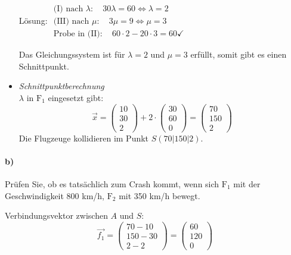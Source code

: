 \documentclass{ajc}
\numberwithin{equation}{subsection}
\begin{document}
\begin{itemize}
		Lösung: $\begin{array}{l}
			\text{(I) nach } \lambda: \quad 30 \lambda = 60 \Leftrightarrow \lambda = 2 \\ \text{(III) nach } \mu: \quad 3\mu = 9 \Leftrightarrow \mu = 3 \\ \text{Probe in  (II)}: \quad 60\cdot2 -20\cdot3 = 60 \checkmark \end{array}$
		
		Das Gleichungssystem ist für $\lambda = 2$ und $\mu = 3$ erfüllt, somit gibt es einen Schnittpunkt.
		
		\item \textit{Schnittpunktberechnung} \\
		$\lambda$ in $\text{F}_1$ eingesetzt gibt: 
		\begin{equation}
			\overrightarrow{x}=\left(\begin{array}{r} 10 \\ 30 \\ 2\end{array}\right) + 2 \cdot \left(\begin{array}{r} 30 \\ 60 \\ 0\end{array}\right) = \left(\begin{array}{r} 70 \\ 150 \\ 2\end{array}\right)
		\end{equation}
		Die Flugzeuge kollidieren im Punkt $S(70|150|2)$.
	\end{itemize}
	
	\paragraph{b)} Prüfen Sie, ob es tatsächlich zum Crash kommt, wenn sich $\text{F}_1$ mit der Geschwindigkeit 800 km/h, $\text{F}_2$ mit 350 km/h bewegt.
	
	Verbindungsvektor zwischen $A$ und $S$:
	\begin{equation}
		\overrightarrow{f_1} = \left(\begin{array}{r} 70 - 10 \\ 150 - 30 \\ 2 - 2\end{array}\right) = \left(\begin{array}{r} 60 \\ 120 \\ 0\end{array}\right) 
	\end{equation}
		
\end{document}
